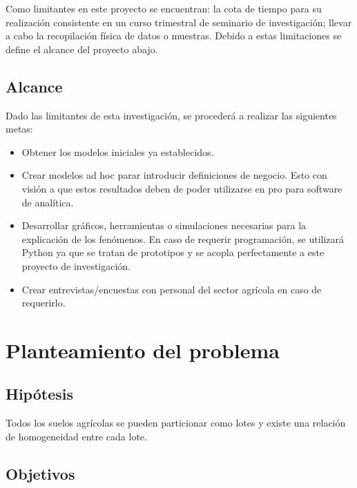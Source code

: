 \documentclass{report}
\begin{document}
\bigbreak

Como limitantes en este proyecto se encuentran: la cota de tiempo para su realización consistente en un curso trimestral de seminario de investigación; llevar a cabo la recopilación física de datos o muestras. Debido a estas limitaciones se define el alcance del proyecto abajo.

\section{Alcance}

Dado las limitantes de esta investigación, se procederá a realizar las siguientes metas:

\begin{itemize}
    \item Obtener los modelos iniciales ya establecidos.
    
    \item Crear modelos ad hoc parar introducir definiciones de negocio. Esto con visión a que estos resultados deben de poder utilizarse en pro para software de analítica.
    
    \item Desarrollar gráficos, herramientas o simulaciones necesarias para la explicación de los fenómenos. En caso de requerir programación, se utilizará Python ya que se tratan de prototipos y se acopla perfectamente a este proyecto de investigación.
    
    \item Crear entrevistas/encuestas con personal del sector agrícola en caso de requerirlo.
\end{itemize}

\bigbreak

\chapter{Planteamiento del problema}

\section{Hipótesis}

Todos los suelos agrícolas se pueden particionar como lotes y existe una relación de homogeneidad entre cada lote.

\section{Objetivos}
\end{document}
